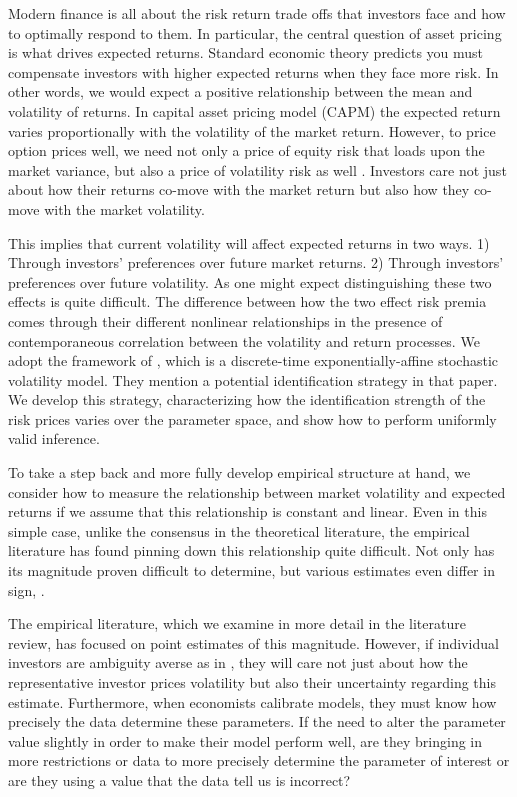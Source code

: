 \documentclass[11pt, letterpaper, twoside, final]{article}
\begin{document}
{}

Modern finance is all about the risk return trade offs that investors face and how to optimally respond to them.  In particular, the central question of asset pricing is what drives expected returns. Standard economic theory predicts you must compensate investors with higher expected returns when they face more risk. In other words, we would expect a positive relationship between the mean and volatility of returns. In  capital asset pricing model (CAPM) the expected return varies proportionally with the volatility of the market return. However, to price option prices well, we need not only a price of equity risk that loads upon the market variance, but also a price of volatility risk as well \parencite{christoffersen2013capturing}. Investors care not just about how their returns co-move with the market return but also how they co-move with the market volatility.

This implies that current volatility will affect expected returns in two ways.  1) Through investors' preferences over future market returns. 2) Through investors' preferences over future volatility. As one might expect distinguishing these two effects is quite difficult. The difference between how the two effect risk premia comes through their different nonlinear relationships in the presence of contemporaneous correlation between the volatility and return processes. We adopt the framework of \textcite{khrapov2016affine}, which is a discrete-time exponentially-affine stochastic volatility model. They mention a potential identification strategy in that paper.  We develop this strategy, characterizing how the identification strength of the risk prices varies over the parameter space, and show how to perform uniformly valid inference.

To take a step back and more fully develop empirical structure at hand, we consider how to measure the
relationship between market volatility and expected returns if we assume that this relationship is constant and
linear. Even in this simple case, unlike the consensus in the theoretical literature, the empirical literature
has found pinning down this relationship quite difficult. Not only has its magnitude proven difficult to
determine, but various estimates even differ in sign, \parencite{lettau2010measuring}.

The empirical literature, which we examine in more detail in the literature review, has focused on point estimates of this magnitude. However, if individual investors are ambiguity averse as in \textcite{hansen2001robust, jiu2012ambiguity}, they will care not just about how the representative investor prices volatility but also their uncertainty regarding this estimate. Furthermore, when economists calibrate models, they must know how precisely the data determine these parameters. If the need to alter the parameter value slightly in order to make their model perform well, are they bringing in more restrictions or data to more precisely determine the parameter of interest or are they using a value that the data tell us is incorrect?
\end{document}
